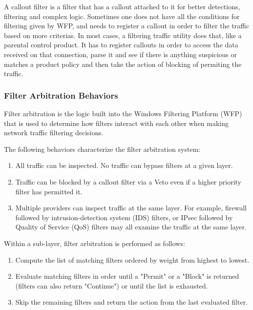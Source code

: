 A callout filter is a filter that has a callout attached to it for better detections, filtering and complex logic. Sometimes one does not have all the conditions for filtering given by WFP, and needs to register a callout in order to filter the traffic based on more criterias.  In most cases, a filtering traffic utility does that, like a parental control product. It has to register callouts in order to access the data received on that connection, parse it and see if there is anything suspicious or matches a product policy and then take the action of blocking of permiting the traffic. 

\subsubsection{Filter Arbitration Behaviors}

\vspace{5mm}

Filter arbitration is the logic built into the Windows Filtering Platform (WFP) that is used to determine how filters interact with each other when making network traffic filtering decisions.

\vspace{5mm}
The following behaviors characterize the filter arbitration system:
\vspace{5mm}

\begin{enumerate}
\item All traffic can be inspected. No traffic can bypass filters at a given layer.
\item Traffic can be blocked by a callout filter via a Veto even if a higher priority filter has permitted it.
\item Multiple providers can inspect traffic at the same layer. For example, firewall followed by intrusion-detection system (IDS) filters, or IPsec followed by Quality of Service (QoS) filters may all examine the traffic at the same layer.
\end{enumerate}
\vspace{5mm}

Within a sub-layer, filter arbitration is performed as follows:

\vspace{5mm}
\begin{enumerate}
\item Compute the list of matching filters ordered by weight from highest to lowest.
\item Evaluate matching filters in order until a "Permit" or a "Block" is returned (filters can also return "Continue") or until the list is exhausted.
\item Skip the remaining filters and return the action from the last evaluated filter.
\end{enumerate}

